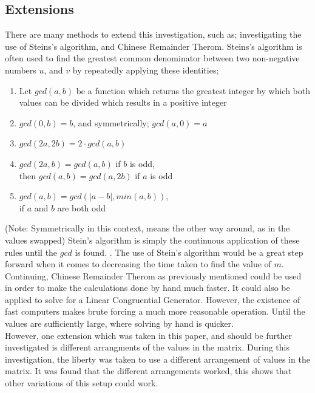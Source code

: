 \documentclass[12pft, english]{article}
\begin{document}
\begin{multicols}{2}
    \subsection{Extensions}
    There are many methods to extend this investigation, such as; investigating the use of Steins's algorithm, and Chinese Remainder Therom. Steins's algorithm is often used to find the greatest common denominator between two non-negative numbers \(u\), and \(v\) by repeatedly applying these identities;
    \begin{enumerate}
      \item Let \(gcd(a,b)\) be a function which returns the greatest integer by which both values can be divided which results in a positive integer
      \item \(gcd(0,b) = b\), and symmetrically; \(gcd(a,0) = a\)
      \item \(gcd(2a,2b) = 2 \cdot gcd(a,b)\)
      \item \(gcd(2a, b) = gcd(a,b)\) if \(b\) is odd,\\
            then \(gcd(a,b) = gcd(a,2b) \) if \(a\) is odd
      \item \(gcd(a,b) = gcd(|a-b|, min(a,b))\),\\
            if \(a\) and \(b\) are both odd
    \end{enumerate}
    (Note: Symmetrically in this context, means the other way around, as in the values swapped)
    Stein's algorithm is simply the continuous application of these rules until the \(gcd\) is found. \citep{steinAlgo}. The use of Stein's algorithm would be a great step forward when it comes to decreasing the time taken to find the value of \(m\). \\
    Continuing, Chinese Remainder Therom as previously mentioned could be used in order to make the calculations done by hand much faster. It could also be applied to solve for a Linear Congruential Generator. However, the existence of fast computers makes brute forcing a much more reasonable operation. Until the values are sufficiently large, where solving by hand is quicker. \citep{fallOntoPlanes} \\
    However, one extension which was taken in this paper, and should be further investigated is different arrangments of the values in the matrix. During this investigation, the liberty was taken to use a different arrangement of values in the matrix. It was found that the different arrangements worked, this shows that other variations of this setup could work.


\end{multicols}


\pagebreak




\end{document}
